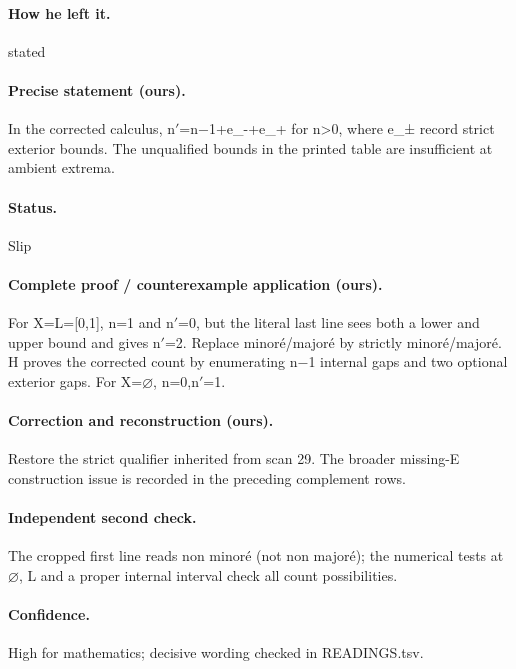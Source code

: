 \paragraph{How he left it.} stated

\paragraph{Precise statement (ours).} In the corrected calculus, n\ensuremath{\prime}=n\ensuremath{-}1+e\_-+e\_+ for n>0, where e\_± record strict exterior bounds. The unqualified bounds in the printed table are insufficient at ambient extrema.

\paragraph{Status.} Slip

\paragraph{Complete proof / counterexample application (ours).} For X=L=[0,1], n=1 and n\ensuremath{\prime}=0, but the literal last line sees both a lower and upper bound and gives n\ensuremath{\prime}=2. Replace minoré/majoré by strictly minoré/majoré. H proves the corrected count by enumerating n\ensuremath{-}1 internal gaps and two optional exterior gaps. For X=\ensuremath{\varnothing}, n=0,n\ensuremath{\prime}=1.

\paragraph{Correction and reconstruction (ours).} Restore the strict qualifier inherited from scan 29. The broader missing-E construction issue is recorded in the preceding complement rows.

\paragraph{Independent second check.} The cropped first line reads non minoré (not non majoré); the numerical tests at \ensuremath{\varnothing}, L and a proper internal interval check all count possibilities.

\paragraph{Confidence.} High for mathematics; decisive wording checked in READINGS.tsv.

